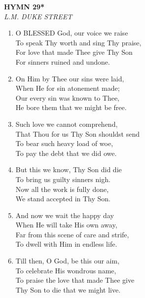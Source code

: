 \newpage
\begin{center}
    {\Large \textbf{HYMN 29*}}
    \\
    \textit{L.M. DUKE STREET}
\end{center}
\vspace{1em}

\begin{enumerate}
    \item O BLESSED God, our voice we raise \\
        To speak Thy worth and sing Thy praise, \\
        For love that made Thee give Thy Son \\
        For sinners ruined and undone.

    \item On Him by Thee our sins were laid, \\
        When He for sin atonement made; \\
        Our every sin was known to Thee, \\
        He bore them that we might be free.

    \item Such love we cannot comprehend, \\
        That Thou for us Thy Son shouldst send \\
        To bear such heavy load of woe, \\
        To pay the debt that we did owe.

    \item But this we know, Thy Son did die \\
        To bring us guilty sinners nigh. \\
        Now all the work is fully done, \\
        We stand accepted in Thy Son.

    \item And now we wait the happy day \\
        When He will take His own away, \\
        Far from this scene of care and strife, \\
        To dwell with Him in endless life.

    \item Till then, O God, be this our aim, \\
        To celebrate His wondrous name, \\
        To praise the love that made Thee give \\
        Thy Son to die that we might live.

\end{enumerate}

